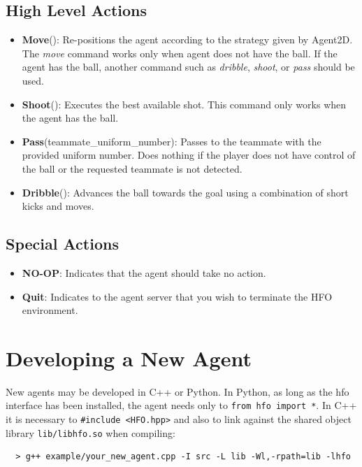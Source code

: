 \documentclass[12pt]{article}
\begin{document}
\subsection{High Level Actions}
\label{sec:high_level_actions}
\begin{itemize}
\item{\textbf{Move}(): Re-positions the agent according to the
  strategy given by Agent2D. The \textit{move} command works only when
  agent does not have the ball. If the agent has the ball, another
  command such as \textit{dribble}, \textit{shoot}, or \textit{pass}
  should be used.}
\item{\textbf{Shoot}(): Executes the best available shot. This command
  only works when the agent has the ball.}
\item{\textbf{Pass}(teammate\_uniform\_number): Passes to the teammate
  with the provided uniform number. Does nothing if the player does
  not have control of the ball or the requested teammate is not
  detected.}
\item{\textbf{Dribble}(): Advances the ball towards the goal using a
  combination of short kicks and moves.}
\end{itemize}

\subsection{Special Actions}
\begin{itemize}
\item{\textbf{NO-OP}: Indicates that the agent should take no action.}
\item{\textbf{Quit}: Indicates to the agent server that you wish to
  terminate the HFO environment.}
\end{itemize}

\section{Developing a New Agent}

New agents may be developed in C++ or Python. In Python, as long as
the hfo interface has been installed, the agent needs only to
\verb+from hfo import *+. In C++ it is necessary to
\verb+#include <HFO.hpp>+ and also to link against the shared object
library \verb+lib/libhfo.so+ when compiling:\\

\begin{verbatim}
  > g++ example/your_new_agent.cpp -I src -L lib -Wl,-rpath=lib -lhfo
\end{verbatim}



\end{document}
